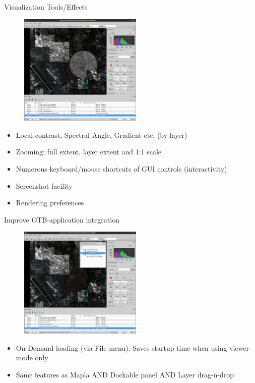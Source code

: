 \documentclass[smaller]{beamer}
\begin{document}
\begin{frame}{Visualization Tools/Effects}

\begin{figure}[ht]
\begin{center}
\includegraphics[height=2.1in]{images/2016-06-06_MVD_Multi_Image-Layer_Support_2.png}
\end{center}
\end{figure}

\begin{itemize}
  \item Local contrast, Spectral Angle, Gradient etc. (by layer)
  \item Zooming: full extent, layer extent and 1:1 scale
  \item Numerous keyboard/mouse shortcuts of GUI controls (interactivity)
  \item Screenshot facility
  \item Rendering preferences
\end{itemize}

\end{frame}

\begin{frame}{Improve OTB-application integration}

\begin{figure}[ht]
\begin{center}
\includegraphics[height=2.1in]{images/2016-06-06_MVD_OTB-applications.png}
\end{center}
\end{figure}

\begin{itemize}
  \item On-Demand loading (via File menu): Saves startup time when using viewer-mode only
  \item Same features as Mapla AND Dockable panel AND Layer drag-n-drop 
\end{itemize}

\end{frame}
\end{document}
